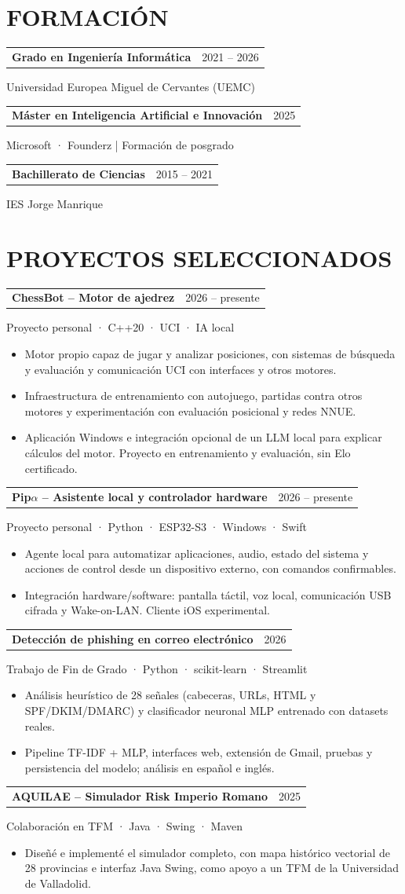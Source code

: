 \documentclass[10pt,a4paper]{article}
\makeatletter
\newcommand{\entry}[3]{\noindent\begin{tabularx}{\linewidth}{@{}Xr@{}}\textbf{#1}&{\small\color{muted}#2}\end{tabularx}\par{\small\color{muted}#3}\par}
\makeatother
\begin{document}
\section*{FORMACIÓN}
\entry{Grado en Ingeniería Informática}{2021 -- 2026}{Universidad Europea Miguel de Cervantes (UEMC)}\vspace{3pt}
\entry{Máster en Inteligencia Artificial e Innovación}{2025}{Microsoft · Founderz | Formación de posgrado}\vspace{3pt}
\entry{Bachillerato de Ciencias}{2015 -- 2021}{IES Jorge Manrique}\vspace{3pt}
\newpage
\section*{PROYECTOS SELECCIONADOS}
\entry{ChessBot -- Motor de ajedrez}{2026 -- presente}{Proyecto personal · C++20 · UCI · IA local}
\begin{itemize}
\item Motor propio capaz de jugar y analizar posiciones, con sistemas de búsqueda y evaluación y comunicación UCI con interfaces y otros motores.
\item Infraestructura de entrenamiento con autojuego, partidas contra otros motores y experimentación con evaluación posicional y redes NNUE.
\item Aplicación Windows e integración opcional de un LLM local para explicar cálculos del motor. Proyecto en entrenamiento y evaluación, sin Elo certificado.
\end{itemize}
\entry{Pip$\alpha$ -- Asistente local y controlador hardware}{2026 -- presente}{Proyecto personal · Python · ESP32-S3 · Windows · Swift}
\begin{itemize}
\item Agente local para automatizar aplicaciones, audio, estado del sistema y acciones de control desde un dispositivo externo, con comandos confirmables.
\item Integración hardware/software: pantalla táctil, voz local, comunicación USB cifrada y Wake-on-LAN. Cliente iOS experimental.
\end{itemize}
\entry{Detección de phishing en correo electrónico}{2026}{Trabajo de Fin de Grado · Python · scikit-learn · Streamlit}
\begin{itemize}
\item Análisis heurístico de 28 señales (cabeceras, URLs, HTML y SPF/DKIM/DMARC) y clasificador neuronal MLP entrenado con datasets reales.
\item Pipeline TF-IDF + MLP, interfaces web, extensión de Gmail, pruebas y persistencia del modelo; análisis en español e inglés.
\end{itemize}
\entry{AQUILAE -- Simulador Risk Imperio Romano}{2025}{Colaboración en TFM · Java · Swing · Maven}
\begin{itemize}
\item Diseñé e implementé el simulador completo, con mapa histórico vectorial de 28 provincias e interfaz Java Swing, como apoyo a un TFM de la Universidad de Valladolid.
\end{itemize}
\end{document}
